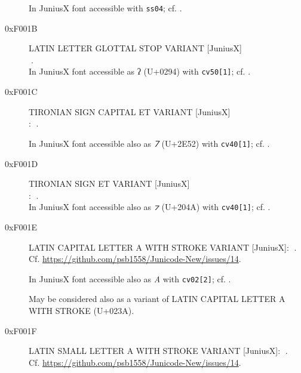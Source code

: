 \documentclass{article}
\newcommand{\Jglyph}[1]{{\relsize{2}\J#1}}
\begin{document}
\begin{description}
    In JuniusX font accessible  with \texttt{ss04};
  cf. \autocite[p. 6]{baker20:_opent_featur_junius_junius}.


\item [0xF001B] LATIN LETTER GLOTTAL STOP VARIANT [JuniusX]\\
  \Jglyph{󰀛}.\\%

    In JuniusX font accessible as ʔ (U+0294)  with \texttt{cv50[1]};
  cf. \autocite[p. 11]{baker20:_opent_featur_junius_junius}.


\item [0xF001C] TIRONIAN SIGN CAPITAL ET VARIANT [JuniusX]\\:
\Jglyph{󰀜}.%

In JuniusX font accessible also as \textit{⹒} (U+2E52) with \texttt{cv40[1]};
  cf. \autocite[p. 12]{baker20:_opent_featur_junius_junius}.

\item [0xF001D] TIRONIAN SIGN ET VARIANT [JuniusX]\\:
  \Jglyph{󰀝}.\\%

  In JuniusX font accessible also as \textit{⁊} (U+204A) with \texttt{cv40[1]};
  cf. \autocite[p. 12]{baker20:_opent_featur_junius_junius}.

\item[0xF001E] LATIN CAPITAL LETTER A WITH STROKE
  VARIANT [JuniusX]: \Jglyph{󰀞}.\\
  Cf. \url{https://github.com/psb1558/Junicode-New/issues/14}.
  
  In JuniusX font accessible also as \textit{A} with \texttt{cv02[2]};
  cf. \autocite[p. 7]{baker20:_opent_featur_junius_junius}.
% 

    May be considered also as a variant of LATIN CAPITAL LETTER A WITH
  STROKE (U+023A).

  
\item [0xF001F] LATIN SMALL LETTER A WITH STROKE  VARIANT [JuniusX]: 
  \Jglyph{󰀟}.\\ Cf. \url{https://github.com/psb1558/Junicode-New/issues/14}.


\end{description}
\end{document}
